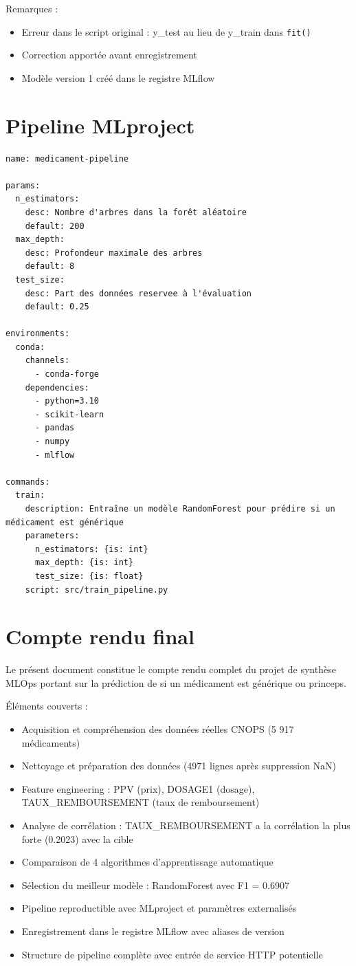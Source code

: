 \documentclass[12pt,a4paper]{report}
\begin{document}
Remarques :
\begin{itemize}
    \item Erreur dans le script original : y\_test au lieu de y\_train dans \texttt{fit()}
    \item Correction apportée avant enregistrement
    \item Modèle version 1 créé dans le registre MLflow
\end{itemize}

\section{Pipeline MLproject}
\begin{verbatim}
name: medicament-pipeline

params:
  n_estimators:
    desc: Nombre d'arbres dans la forêt aléatoire
    default: 200
  max_depth:
    desc: Profondeur maximale des arbres
    default: 8
  test_size:
    desc: Part des données reservee à l'évaluation
    default: 0.25

environments:
  conda:
    channels:
      - conda-forge
    dependencies:
      - python=3.10
      - scikit-learn
      - pandas
      - numpy
      - mlflow

commands:
  train:
    description: Entraîne un modèle RandomForest pour prédire si un médicament est générique
    parameters:
      n_estimators: {is: int}
      max_depth: {is: int}
      test_size: {is: float}
    script: src/train_pipeline.py
\end{verbatim}

\section{Compte rendu final}
Le présent document constitue le compte rendu complet du projet de synthèse MLOps portant sur la prédiction de si un médicament est générique ou princeps.

Éléments couverts :
\begin{itemize}
    \item Acquisition et compréhension des données réelles CNOPS (5 917 médicaments)
    \item Nettoyage et préparation des données (4971 lignes après suppression NaN)
    \item Feature engineering : PPV (prix), DOSAGE1 (dosage), TAUX\_REMBOURSEMENT (taux de remboursement)
    \item Analyse de corrélation : TAUX\_REMBOURSEMENT a la corrélation la plus forte (0.2023) avec la cible
    \item Comparaison de 4 algorithmes d'apprentissage automatique
    \item Sélection du meilleur modèle : RandomForest avec F1 = 0.6907
    \item Pipeline reproductible avec MLproject et paramètres externalisés
    \item Enregistrement dans le registre MLflow avec aliases de version
    \item Structure de pipeline complète avec entrée de service HTTP potentielle
\end{itemize}
\end{document}

